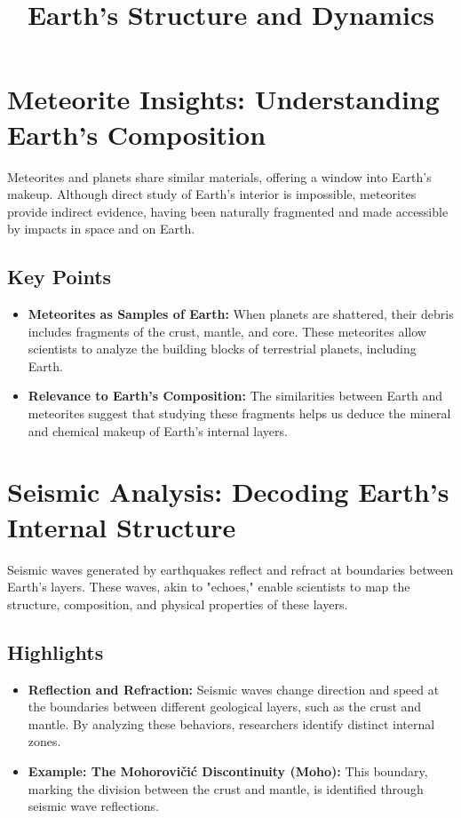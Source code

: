 \documentclass{article}
\title{Earth's Structure and Dynamics}
\date{}
\begin{document}
\maketitle

\section*{Meteorite Insights: Understanding Earth's Composition}

Meteorites and planets share similar materials, offering a window into Earth's makeup. Although direct study of Earth's interior is impossible, meteorites provide indirect evidence, having been naturally fragmented and made accessible by impacts in space and on Earth.

\subsection*{Key Points}
\begin{itemize}
    \item \textbf{Meteorites as Samples of Earth:} When planets are shattered, their debris includes fragments of the crust, mantle, and core. These meteorites allow scientists to analyze the building blocks of terrestrial planets, including Earth.
    \item \textbf{Relevance to Earth's Composition:} The similarities between Earth and meteorites suggest that studying these fragments helps us deduce the mineral and chemical makeup of Earth's internal layers.
\end{itemize}

\section*{Seismic Analysis: Decoding Earth's Internal Structure}

Seismic waves generated by earthquakes reflect and refract at boundaries between Earth's layers. These waves, akin to "echoes," enable scientists to map the structure, composition, and physical properties of these layers.

\subsection*{Highlights}
\begin{itemize}
    \item \textbf{Reflection and Refraction:} Seismic waves change direction and speed at the boundaries between different geological layers, such as the crust and mantle. By analyzing these behaviors, researchers identify distinct internal zones.
    \item \textbf{Example: The Mohorovičić Discontinuity (Moho):} This boundary, marking the division between the crust and mantle, is identified through seismic wave reflections.
\end{itemize}
\end{document}
